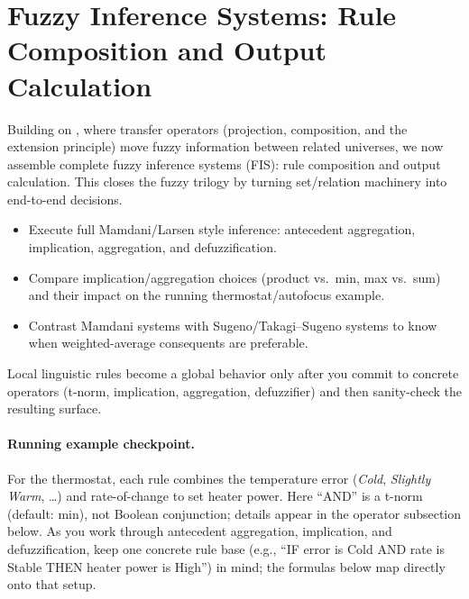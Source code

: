 \section{Fuzzy Inference Systems: Rule Composition and Output Calculation}\label{chap:fuzzyinference}

Building on , where transfer operators (projection, composition, and the extension principle) move fuzzy information between related universes, we now assemble complete fuzzy inference systems (FIS): rule composition and output calculation. This closes the fuzzy trilogy by turning set/relation machinery into end-to-end decisions.

\begin{tcolorbox}[summarybox, title={Learning Outcomes}]
\begin{itemize}
    \item Execute full Mamdani/Larsen style inference: antecedent aggregation, implication, aggregation, and defuzzification.
    \item Compare implication/aggregation choices (product vs.\ min, max vs.\ sum) and their impact on the running thermostat/autofocus example.
    \item Contrast Mamdani systems with Sugeno/Takagi--Sugeno systems to know when weighted-average consequents are preferable.
\end{itemize}
\end{tcolorbox}

\begin{tcolorbox}[summarybox, title={Design motif}]
Local linguistic rules become a global behavior only after you commit to concrete operators (t\hyp{}norm, implication, aggregation, defuzzifier) and then sanity-check the resulting surface.
\end{tcolorbox}

\paragraph{Running example checkpoint.}
For the thermostat, each rule combines the temperature error (\textit{Cold}, \textit{Slightly Warm}, \ldots) and rate-of-change to set heater power. Here ``AND'' is a t\hyp{}norm (default: min), not Boolean conjunction; details appear in the operator subsection below. As you work through antecedent aggregation, implication, and defuzzification, keep one concrete rule base (e.g., ``IF error is Cold AND rate is Stable THEN heater power is High'') in mind; the formulas below map directly onto that setup.

